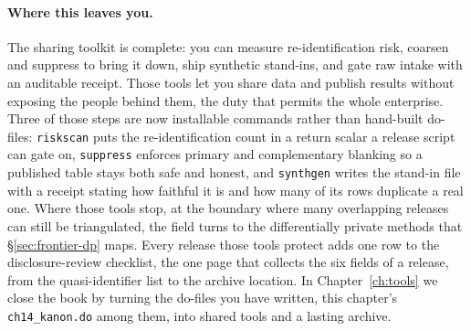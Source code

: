 \documentclass[
    a4paper,
    fontsize=10pt,
    twoside=true,
    numbers=noenddot,
]{kaobook}
\begin{document}
\paragraph{Where this leaves you.} The sharing toolkit is complete: you can measure re-identification risk, coarsen and suppress to bring it down, ship synthetic stand-ins, and gate raw intake with an auditable receipt.  Those tools let you share data and publish results without exposing the people behind them, the duty that permits the whole enterprise. Three of those steps are now installable commands rather than hand-built do-files: \texttt{riskscan} puts the re-identification count in a return scalar a release script can gate on, \texttt{suppress} enforces primary and complementary blanking so a published table stays both safe and honest, and \texttt{synthgen} writes the stand-in file with a receipt stating how faithful it is and how many of its rows duplicate a real one. Where those tools stop, at the boundary where many overlapping releases can still be triangulated, the field turns to the differentially private methods that \S\ref{sec:frontier-dp} maps. Every release those tools protect adds one row to the disclosure-review checklist, the one page that collects the six fields of a release, from the quasi-identifier list to the archive location. In Chapter~\ref{ch:tools} we close the book by turning the do-files you have written, this chapter's \texttt{ch14\_kanon.do} among them, into shared tools and a lasting archive.
\end{document}

